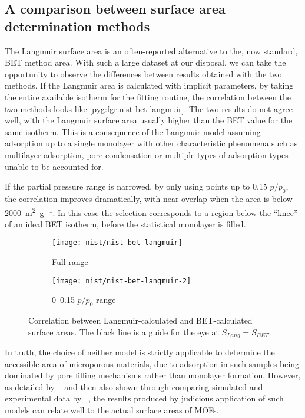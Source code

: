 \subsection{A comparison between surface area determination methods}

The Langmuir surface area is an often-reported alternative 
to the, now standard, BET method area.
With such a large dataset at our disposal, we can take
the opportunity to observe the differences between results
obtained with the two methods.
If the Langmuir area is calculated with implicit parameters,
by taking the entire available isotherm for the fitting
routine, the correlation between the two methods looks
like \autoref{pyg:fgr:nist-bet-langmuir}. The two results
do not agree well, with the Langmuir surface 
area usually higher than the BET value for the 
same isotherm. This is a consequence of the Langmuir model
assuming adsorption up to a single monolayer with other
characteristic phenomena such as multilayer adsorption,
pore condensation or multiple types of adsorption types
unable to be accounted for.

If the partial pressure range is narrowed, by only using 
points up to 0.15 \(p/p_0\), the correlation improves 
dramatically, with near-overlap when the area is below 
\SI{2000}{\metre^2\per\gram}. In this case the selection corresponds
to a region below the ``knee'' of an ideal BET isotherm,
before the statistical monolayer is filled.

\begin{figure}[htb]
    \centering

    \begin{subfigure}{0.42\linewidth}
        \texttt{[image: nist/nist-bet-langmuir]}
        \caption{Full range}%
        \label{pyg:fgr:nist-bet-langmuir}
    \end{subfigure}%
    \begin{subfigure}{0.5\linewidth}
        \texttt{[image: nist/nist-bet-langmuir-2]}
        \caption{0--0.15 \(p/p_0\) range}%
        \label{pyg:fgr:nist-bet-langmuir-adj}
    \end{subfigure}%

    \caption{Correlation between Langmuir-calculated and 
    BET-calculated surface areas. The black line is a guide
    for the eye at \(S_{Lang} = S_{BET}\).}%
    \label{pyg:fgr:nist-area-cmp}
\end{figure}

In truth, the choice of neither model is strictly 
applicable to determine the accessible area of microporous
materials, due to adsorption in such samples being dominated
by pore filling mechanisms rather than monolayer formation.
However, as detailed by 
\citeauthor{rouquerolBetEquationApplicable2007}~\cite{rouquerolBetEquationApplicable2007}
and then also shown through comparing simulated and 
experimental data by
\citeauthor{waltonApplicabilityBETMethod2007}~\cite{waltonApplicabilityBETMethod2007}, the results
produced by judicious application of such models can relate
well to the actual surface areas of MOFs.

